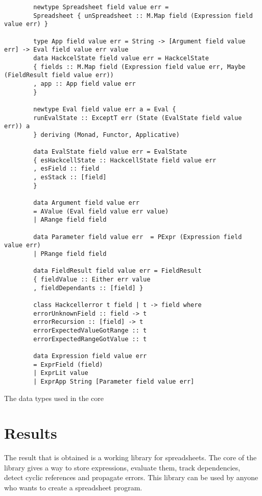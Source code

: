 \documentclass{article}
\begin{document}
	\begin{listing}
		\begin{verbatim}
		newtype Spreadsheet field value err =
		Spreadsheet { unSpreadsheet :: M.Map field (Expression field value err) }
		
		type App field value err = String -> [Argument field value err] -> Eval field value err value
		data HackcelState field value err = HackcelState
		{ fields :: M.Map field (Expression field value err, Maybe (FieldResult field value err))
		, app :: App field value err
		}
		
		newtype Eval field value err a = Eval {
		runEvalState :: ExceptT err (State (EvalState field value err)) a
		} deriving (Monad, Functor, Applicative)
		
		data EvalState field value err = EvalState
		{ esHackcellState :: HackcellState field value err
		, esField :: field
		, esStack :: [field]
		}
		
		data Argument field value err
		= AValue (Eval field value err value)
		| ARange field field
		
		data Parameter field value err  = PExpr (Expression field value err)
		| PRange field field
		
		data FieldResult field value err = FieldResult
		{ fieldValue :: Either err value
		, fieldDependants :: [field] }
		
		class Hackcellerror t field | t -> field where
		errorUnknownField :: field -> t
		errorRecursion :: [field] -> t
		errorExpectedValueGotRange :: t
		errorExpectedRangeGotValue :: t
		
		data Expression field value err
		= ExprField (field)
		| ExprLit value
		| ExprApp String [Parameter field value err]
		\end{verbatim}
		\caption{The data types used in the core}
		\label{listing:datatypes}
	\end{listing}
	
	\section{Results}
	The result that is obtained is a working library for spreadsheets. The core of the library gives a way to store expressions, evaluate them, track dependencies, detect cyclic references and propagate errors. This library can be used by anyone who wants to create a spreadsheet program.
\end{document}
